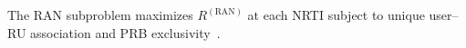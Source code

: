 \documentclass[12pt,lettersize,journal,onecolumn]{IEEEtran}
\newcounter{constraintR}
\renewcommand{\theconstraintR}{C\arabic{constraintR}-R}
\newenvironment{NamedConstraintR}{%
  \refstepcounter{constraintR}%
  \par\noindent
  \textbf{\theconstraintR:}\,    %
  \begin{math}
}{%
  \end{math}
  \par\vspace{2pt}%
}
\begin{document}
The RAN subproblem maximizes $R^{\mathrm{(RAN)}}$ at each NRTI subject to unique user--RU association and PRB exclusivity~\cite[eq.~(8)]{camad24ebrahimi}.

\end{document}
